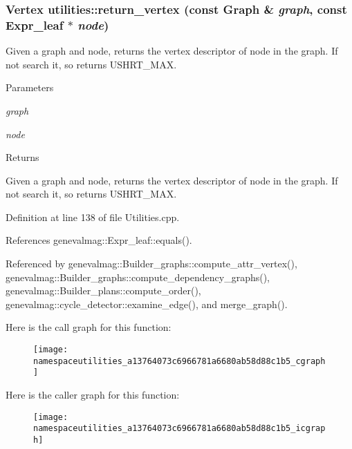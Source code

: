 \hypertarget{namespaceutilities_a13764073c6966781a6680ab58d88c1b5}{
\subsubsection[{return\_\-vertex}]{\setlength{\rightskip}{0pt plus 5cm}Vertex utilities::return\_\-vertex (const Graph \& {\em graph}, \/  const {\bf Expr\_\-leaf} $\ast$ {\em node})}}
\label{namespaceutilities_a13764073c6966781a6680ab58d88c1b5}
Given a graph and node, returns the vertex descriptor of node in the graph. If not search it, so returns USHRT\_\-MAX. 
\begin{DoxyParams}{Parameters}
\item[{\em graph}]\item[{\em node}]\end{DoxyParams}
\begin{DoxyReturn}{Returns}

\end{DoxyReturn}
Given a graph and node, returns the vertex descriptor of node in the graph. If not search it, so returns USHRT\_\-MAX. 

Definition at line 138 of file Utilities.cpp.



References genevalmag::Expr\_\-leaf::equals().



Referenced by genevalmag::Builder\_\-graphs::compute\_\-attr\_\-vertex(), genevalmag::Builder\_\-graphs::compute\_\-dependency\_\-graphs(), genevalmag::Builder\_\-plans::compute\_\-order(), genevalmag::cycle\_\-detector::examine\_\-edge(), and merge\_\-graph().



Here is the call graph for this function:\nopagebreak
\begin{figure}[H]
\begin{center}
\leavevmode
\texttt{[image: namespaceutilities\_a13764073c6966781a6680ab58d88c1b5\_cgraph]}
\end{center}
\end{figure}




Here is the caller graph for this function:\nopagebreak
\begin{figure}[H]
\begin{center}
\leavevmode
\texttt{[image: namespaceutilities\_a13764073c6966781a6680ab58d88c1b5\_icgraph]}
\end{center}
\end{figure}



